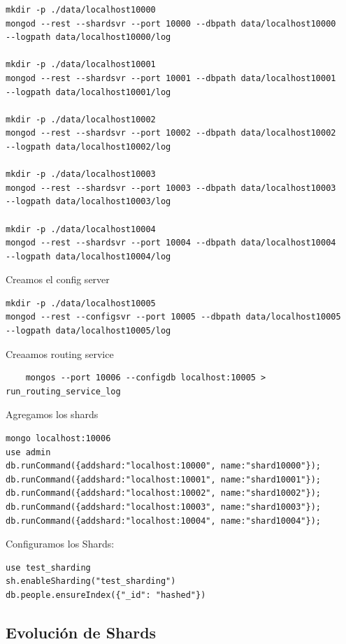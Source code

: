 \documentclass[a4paper, 10pt, twoside]{article}
\begin{document}
\begin{verbatim}
mkdir -p ./data/localhost10000
mongod --rest --shardsvr --port 10000 --dbpath data/localhost10000 
--logpath data/localhost10000/log

mkdir -p ./data/localhost10001
mongod --rest --shardsvr --port 10001 --dbpath data/localhost10001 
--logpath data/localhost10001/log

mkdir -p ./data/localhost10002
mongod --rest --shardsvr --port 10002 --dbpath data/localhost10002 
--logpath data/localhost10002/log

mkdir -p ./data/localhost10003
mongod --rest --shardsvr --port 10003 --dbpath data/localhost10003 
--logpath data/localhost10003/log

mkdir -p ./data/localhost10004
mongod --rest --shardsvr --port 10004 --dbpath data/localhost10004 
--logpath data/localhost10004/log

\end{verbatim}


Creamos el config server 

\begin{verbatim}
mkdir -p ./data/localhost10005
mongod --rest --configsvr --port 10005 --dbpath data/localhost10005 
--logpath data/localhost10005/log
\end{verbatim}

Creaamos routing service

\begin{verbatim}
    mongos --port 10006 --configdb localhost:10005 > run_routing_service_log
\end{verbatim}


Agregamos los shards

\begin{verbatim}
mongo localhost:10006
use admin
db.runCommand({addshard:"localhost:10000", name:"shard10000"});
db.runCommand({addshard:"localhost:10001", name:"shard10001"});
db.runCommand({addshard:"localhost:10002", name:"shard10002"});
db.runCommand({addshard:"localhost:10003", name:"shard10003"});
db.runCommand({addshard:"localhost:10004", name:"shard10004"});
\end{verbatim}

Configuramos los Shards:

\begin{verbatim}
use test_sharding
sh.enableSharding("test_sharding")
db.people.ensureIndex({"_id": "hashed"})
\end{verbatim}

\subsection{Evoluci\'on de Shards}
\end{document}
